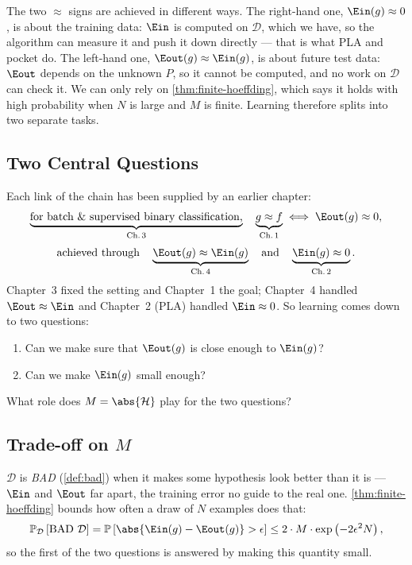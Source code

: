 The two \(\approx\) signs are achieved in different ways. The right-hand one,
\(\Ein(g) \approx 0\), is about the training data: \(\Ein\) is computed on
\(\mathcal{D}\), which we have, so the algorithm can measure it and push it down
directly --- that is what PLA and pocket do. The left-hand one,
\(\Eout(g) \approx \Ein(g)\), is about future test data: \(\Eout\) depends on the
unknown \(P\), so it cannot be computed, and no work on \(\mathcal{D}\) can check
it. We can only rely on \autoref{thm:finite-hoeffding}, which says it holds with
high probability when \(N\) is large and \(M\) is finite. Learning therefore
splits into two separate tasks.

\subsection{Two Central Questions}

Each link of the chain has been supplied by an earlier chapter:
\[
    \underbrace{\text{for batch \& supervised binary classification,}}_{\text{Ch.\,3}}
    \quad
    \underbrace{g \approx f}_{\text{Ch.\,1}}
    \iff \Eout(g) \approx 0 ,
\]
\[
    \text{achieved through}\quad
    \underbrace{\Eout(g) \approx \Ein(g)}_{\text{Ch.\,4}}
    \quad\text{and}\quad
    \underbrace{\Ein(g) \approx 0}_{\text{Ch.\,2}} .
\]
Chapter~3 fixed the setting and Chapter~1 the goal; Chapter~4 handled
\(\Eout \approx \Ein\) and Chapter~2 (PLA) handled \(\Ein \approx 0\). So
learning comes down to two questions:

\begin{enumerate}
    \item Can we make sure that \(\Eout(g)\) is close enough to \(\Ein(g)\)?
    \item Can we make \(\Ein(g)\) small enough?
\end{enumerate}

\begin{question}\label{q:role-of-M}
    What role does \(M = \abs{\mathcal{H}}\) play for the two questions?
\end{question}

\subsection{Trade-off on \texorpdfstring{\(M\)}{M}}

\begin{recall}
    \(\mathcal{D}\) is \emph{BAD} (\autoref{def:bad}) when it makes some
    hypothesis look better than it is --- \(\Ein\) and \(\Eout\) far apart, the
    training error no guide to the real one. \autoref{thm:finite-hoeffding}
    bounds how often a draw of \(N\) examples does that:
    \[
        \mathbb{P}_{\mathcal{D}}\left[ \text{BAD } \mathcal{D} \right]
        = \mathbb{P}\left[ \abs{\Ein(g) - \Eout(g)} > \epsilon \right]
        \le 2 \cdot M \cdot \exp \left( -2 \epsilon^2 N \right) ,
    \]
    so the first of the two questions is answered by making this quantity
    small.
\end{recall}

